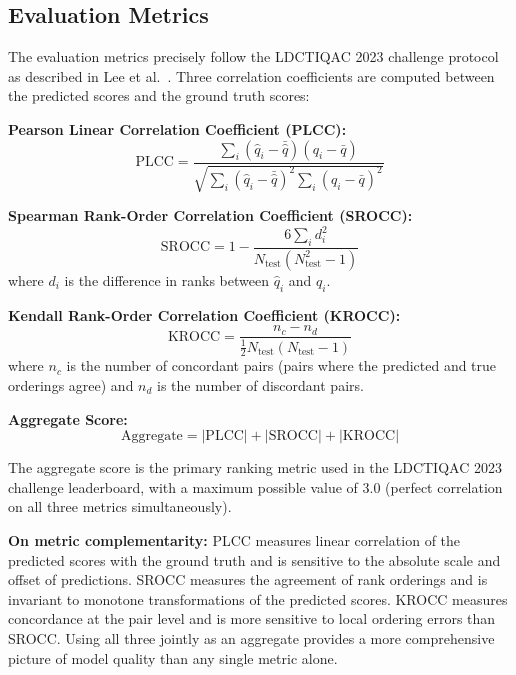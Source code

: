 \subsection{Evaluation Metrics}

The evaluation metrics precisely follow the LDCTIQAC 2023 challenge protocol as
described in Lee et al.\ \cite{lee2025ldctiqac}. Three correlation coefficients are
computed between the predicted scores and the ground truth scores:

\textbf{Pearson Linear Correlation Coefficient (PLCC):}
\begin{equation}
    \text{PLCC} = \frac{\sum_{i}(\hat{q}_i - \bar{\hat{q}})(q_i - \bar{q})}
                       {\sqrt{\sum_{i}(\hat{q}_i - \bar{\hat{q}})^2
                              \sum_{i}(q_i - \bar{q})^2}}
    \label{eq:plcc}
\end{equation}

\textbf{Spearman Rank-Order Correlation Coefficient (SROCC):}
\begin{equation}
    \text{SROCC} = 1 - \frac{6\sum_{i} d_i^2}{N_{\text{test}}(N_{\text{test}}^2 - 1)}
    \label{eq:srocc}
\end{equation}
where $d_i$ is the difference in ranks between $\hat{q}_i$ and $q_i$.

\textbf{Kendall Rank-Order Correlation Coefficient (KROCC):}
\begin{equation}
    \text{KROCC} = \frac{n_c - n_d}{\frac{1}{2}N_{\text{test}}(N_{\text{test}} - 1)}
    \label{eq:krocc}
\end{equation}
where $n_c$ is the number of concordant pairs (pairs where the predicted and true
orderings agree) and $n_d$ is the number of discordant pairs.

\textbf{Aggregate Score:}
\begin{equation}
    \text{Aggregate} = |\text{PLCC}| + |\text{SROCC}| + |\text{KROCC}|
    \label{eq:aggregate}
\end{equation}

The aggregate score is the primary ranking metric used in the LDCTIQAC 2023 challenge
leaderboard, with a maximum possible value of 3.0 (perfect correlation on all three
metrics simultaneously).

\textbf{On metric complementarity:} PLCC measures linear correlation of the predicted
scores with the ground truth and is sensitive to the absolute scale and offset of
predictions. SROCC measures the agreement of rank orderings and is invariant to monotone
transformations of the predicted scores. KROCC measures concordance at the pair level
and is more sensitive to local ordering errors than SROCC. Using all three jointly as
an aggregate provides a more comprehensive picture of model quality than any single
metric alone.

